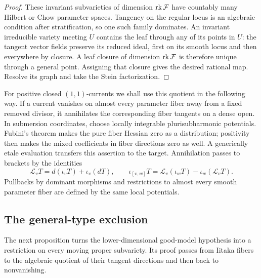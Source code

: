 \begin{proof}
These invariant subvarieties of dimension \(\operatorname{rk}\mathcal F\) have countably many
Hilbert or Chow parameter spaces. Tangency on the regular locus is
an algebraic condition after stratification, so one such family
dominates. An invariant irreducible variety meeting \(U\) contains
the leaf through any of its points in \(U\): the tangent vector
fields preserve its reduced ideal, first on its smooth locus and
then everywhere by closure. A leaf closure of dimension \(\operatorname{rk}\mathcal F\) is
therefore unique through a general point. Assigning that closure
gives the desired rational map. Resolve its graph and take the
Stein factorization.
\end{proof}

For positive closed \((1,1)\)-currents we shall use this quotient in
the following way. If a current vanishes on almost every parameter
fiber away from a fixed removed divisor, it annihilates the
corresponding fiber tangents on a dense open. In submersion
coordinates, choose locally integrable plurisubharmonic potentials.
Fubini's theorem makes the pure fiber Hessian zero as a
distribution; positivity then makes the mixed coefficients in
fiber directions zero as well. A generically etale evaluation
transfers this assertion to the target. Annihilation passes to
brackets by the identities
\[
 \mathcal L_v T=d(\iota_vT)+\iota_v(dT),\qquad
 \iota_{[v,w]}T=\mathcal L_v(\iota_wT)-\iota_w(\mathcal L_vT).
\]
Pullbacks by dominant morphisms and restrictions to almost every
smooth parameter fiber are defined by the same local potentials.

\subsection{The general-type exclusion}

The next proposition turns the lower-dimensional good-model hypothesis
into a restriction on every moving proper subvariety. Its proof passes
from Iitaka fibers to the algebraic quotient of their tangent
directions and then back to nonvanishing.

